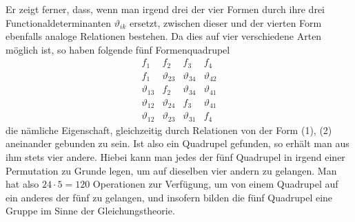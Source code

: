 \documentclass[11pt]{article}
\providecommand{\weberpage}[1]{}
\begin{document}
\weberpage{163}
Er zeigt ferner, dass, wenn man irgend drei der vier Formen durch ihre drei Functionaldeterminanten $\vartheta_{ik}$ ersetzt, zwischen dieser und der vierten Form ebenfalls analoge Relationen bestehen. Da dies auf vier verschiedene Arten möglich ist, so haben folgende fünf Formenquadrupel
\[
\begin{array}{cccc}
f_1 & f_2 & f_3 & f_4\\
f_1 & \vartheta_{23} & \vartheta_{34} & \vartheta_{42}\\
\vartheta_{13} & f_2 & \vartheta_{34} & \vartheta_{41}\\
\vartheta_{12} & \vartheta_{24} & f_3 & \vartheta_{41}\\
\vartheta_{12} & \vartheta_{23} & \vartheta_{31} & f_4
\end{array}
\]
die nämliche Eigenschaft, gleichzeitig durch Relationen von der Form (1), (2) aneinander gebunden zu sein. Ist also ein Quadrupel gefunden, so erhält man aus ihm stets vier andere. Hiebei kann man jedes der fünf Quadrupel in irgend einer Permutation zu Grunde legen, um auf dieselben vier andern zu gelangen. Man hat also $24\cdot5=120$ Operationen zur Verfügung, um von einem Quadrupel auf ein anderes der fünf zu gelangen, und insofern bilden die fünf Quadrupel eine Gruppe im Sinne der Gleichungstheorie.
\end{document}
